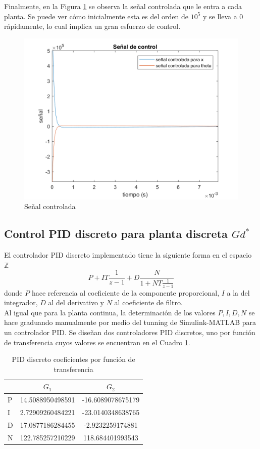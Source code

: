 \documentclass[journal]{IEEEtran}
\begin{document}
Finalmente, en la Figura \ref{fig:senal} se observa la señal controlada que le entra a cada planta. Se puede ver cómo inicialmente esta es del orden de $10^5$ y se lleva a 0 rápidamente, lo cual implica un gran esfuerzo de control.

\begin{figure}[!h]
\caption{Señal controlada\label{fig:senal}}
  \centering
\includegraphics[scale=0.18]{Bode/se_al_controlada.png}
\end{figure}

\subsection*{Control PID discreto para planta discreta $Gd^*$}

El controlador PID discreto implementado tiene la siguiente forma en el espacio $\mathbb{Z}$
$$P+IT\frac{1}{z-1}+D\frac{N}{1+NT\frac{1}{z-1}}$$
donde $P$ hace referencia al coeficiente de la componente proporcional, $I$ a la del integrador, $D$ al del derivativo y $N$ al coeficiente de filtro.\\

Al igual que para la planta continua, la determinación de los valores $P,I,D,N$ se hace graduando manualmente por medio del tunning de Simulink-MATLAB para un controlador PID. Se diseñan dos controladores PID discretos, uno por función de transferencia cuyos valores se encuentran en el Cuadro \ref{tab:PIDD}.\\ 

\begin{table}[!h]
\centering
\caption{PID discreto coeficientes por función de transferencia}
\label{tab:PIDD}
\begin{tabular}{@{}lcc@{}}
\toprule
                  & $G_1$ & $G_2$          \\ \midrule
P & 14.5088950498591 & -16.6089078675179 \\
I & 2.72909260484221 & -23.0140348638765           \\
D & 17.0877186284455 & -2.9232259174881                  \\
N & 122.785257210229 & 118.684401993543 \\ \bottomrule
\end{tabular}
\end{table}
\end{document}
